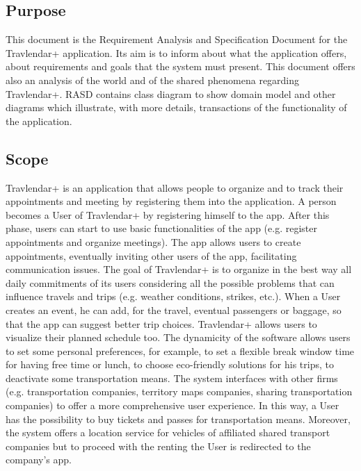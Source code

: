 \subsection{Purpose}
This document is the Requirement Analysis and Specification Document for the Travlendar+ application. Its aim is
to inform about what the application offers, about requirements and goals that the system must present. This document offers also an analysis of the world and of the shared phenomena regarding Travlendar+. RASD contains class diagram to show domain model and other diagrams which illustrate, with more details, transactions of the functionality of the application.
\subsection{Scope}
Travlendar+ is an application that allows people to organize and to track their appointments and meeting by 
registering them into the application. A person becomes a User of Travlendar+ by registering himself to the app. After this phase, users can start to use basic functionalities of the app (e.g. register appointments and organize meetings).\newline 
The app allows users to create appointments, eventually inviting other users of the app, facilitating communication issues.
The goal of Travlendar+ is to organize in the best way all daily commitments of its users considering all the possible problems that can influence travels and trips (e.g. weather conditions, strikes, etc.).\newline
When a User creates an event, he can add, for the travel, eventual passengers or baggage, so that the app can suggest better trip choices. Travlendar+ allows users to visualize their planned schedule too.\newline 
The dynamicity of the software allows users to set some personal preferences, for example, to set a flexible break window time for having free time or lunch, to choose eco-friendly solutions for his trips, to deactivate some transportation means.\newline 
The system interfaces with other firms (e.g. transportation companies, territory maps companies, sharing transportation companies) to offer a more comprehensive user experience. In this way, a User has the possibility to buy tickets and passes for transportation means. Moreover, the system offers a location service for vehicles of affiliated shared transport companies but to proceed with the renting the User is redirected to the company's app.

